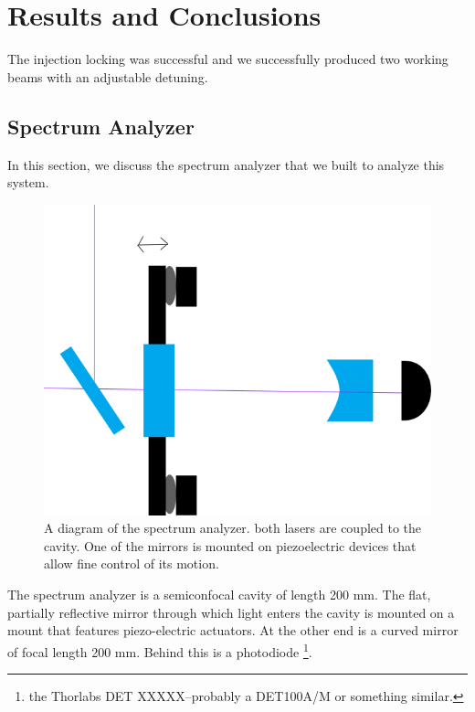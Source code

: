 \chapter{Results and Conclusions}

The injection locking was successful and we successfully produced two working beams with an adjustable detuning. 

\section{Spectrum Analyzer}
In this section, we discuss the spectrum analyzer that we built to analyze this system. 

\begin{figure}
    \centerline{\includegraphics[totalheight=0.3\textheight ]{spectrumAnalyzer}}
    \caption[]{\label{fig:spectrumAnalyzer}
    A diagram of the spectrum analyzer. both lasers are coupled to the cavity. One of the mirrors is mounted on piezoelectric devices that allow fine control of its motion. 
}
\end{figure}

The spectrum analyzer is a semiconfocal cavity of length 200 mm. The flat, partially reflective mirror through which light enters the cavity is mounted on a mount that features piezo-electric actuators. At the other end is a curved mirror of focal length 200 mm. Behind this is a photodiode \footnote{the Thorlabs DET XXXXX--probably a DET100A/M or something similar.}.

